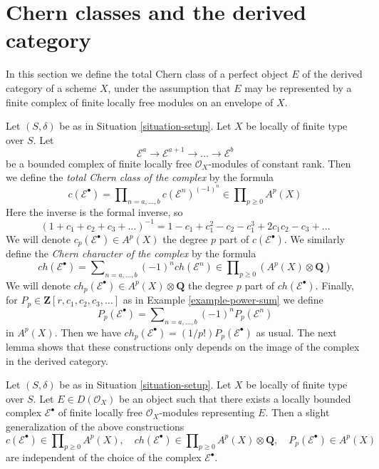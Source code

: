 \section{Chern classes and the derived category}
\label{section-pre-derived}

\noindent
In this section we define the total Chern class of a perfect object $E$
of the derived category of a scheme $X$, under the assumption that $E$
may be represented by a finite complex of finite locally free modules
on an envelope of $X$.

\medskip\noindent
Let $(S, \delta)$ be as in Situation \ref{situation-setup}.
Let $X$ be locally of finite type over $S$. Let
$$
\mathcal{E}^a \to \mathcal{E}^{a + 1} \to \ldots \to \mathcal{E}^b
$$
be a bounded complex of finite locally free $\mathcal{O}_X$-modules
of constant rank.
Then we define the {\it total Chern class of the complex} by the formula
$$
c(\mathcal{E}^\bullet) = \prod\nolimits_{n = a, \ldots, b}
c(\mathcal{E}^n)^{(-1)^n} \in \prod\nolimits_{p \geq 0} A^p(X)
$$
Here the inverse is the formal inverse, so
$$
(1 + c_1 + c_2 + c_3 + \ldots)^{-1} =
1 - c_1 + c_1^2 - c_2 - c_1^3 + 2c_1 c_2 - c_3 + \ldots
$$
We will denote $c_p(\mathcal{E}^\bullet) \in A^p(X)$
the degree $p$ part of $c(\mathcal{E}^\bullet)$.
We similarly define the {\it Chern character of the complex} by
the formula
$$
ch(\mathcal{E}^\bullet) = \sum\nolimits_{n = a, \ldots, b}
(-1)^n ch(\mathcal{E}^n) \in
\prod\nolimits_{p \geq 0} (A^p(X) \otimes \mathbf{Q})
$$
We will denote $ch_p(\mathcal{E}^\bullet) \in A^p(X) \otimes \mathbf{Q}$
the degree $p$ part of $ch(\mathcal{E}^\bullet)$.
Finally, for $P_p \in \mathbf{Z}[r, c_1, c_2, c_3, \ldots]$
as in Example \ref{example-power-sum} we define
$$
P_p(\mathcal{E}^\bullet) = \sum\nolimits_{n = a, \ldots, b}
(-1)^n P_p(\mathcal{E}^n)
$$
in $A^p(X)$. Then we have
$ch_p(\mathcal{E}^\bullet) = (1/p!)P_p(\mathcal{E}^\bullet)$
as usual. The next lemma shows that these constructions only depends
on the image of the complex in the derived category.

\begin{lemma}
\label{lemma-pre-derived-chern-class}
Let $(S, \delta)$ be as in Situation \ref{situation-setup}.
Let $X$ be locally of finite type over $S$. Let $E \in D(\mathcal{O}_X)$
be an object such that there exists a locally bounded complex
$\mathcal{E}^\bullet$ of finite locally free $\mathcal{O}_X$-modules
representing $E$. Then a slight generalization of the above constructions
$$
c(\mathcal{E}^\bullet) \in \prod\nolimits_{p \geq 0} A^p(X),\quad
ch(\mathcal{E}^\bullet) \in
\prod\nolimits_{p \geq 0} A^p(X) \otimes \mathbf{Q},\quad
P_p(\mathcal{E}^\bullet) \in A^p(X)
$$
are independent of the choice of the complex $\mathcal{E}^\bullet$.
\end{lemma}

